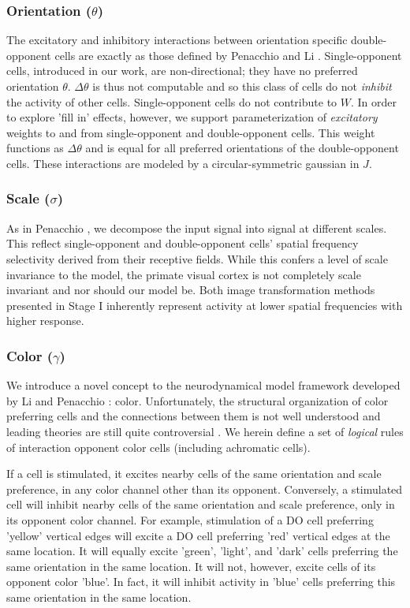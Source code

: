\documentclass[journal,onecolumn]{IEEEtran}
\begin{document}
\subsubsection*{Orientation ($\theta$)}
The excitatory and inhibitory interactions between orientation specific double-opponent cells are exactly as those defined by Penacchio \cite{penacchio:2013} and Li \cite{li:1999}. Single-opponent cells, introduced in our work, are non-directional; they have no preferred orientation $\theta$. $\Delta\theta$ is thus not computable and so this class of cells do not \textit{inhibit} the activity of other cells. Single-opponent cells do not contribute to $W$. In order to explore 'fill in' effects, however, we support parameterization of \textit{excitatory} weights to and from single-opponent and double-opponent cells. This weight functions as $\Delta\theta$ and is equal for all preferred orientations of the double-opponent cells. These interactions are modeled by a circular-symmetric gaussian in $J$. 

\subsubsection*{Scale ($\sigma$)}
As in Penacchio \cite{penacchio:2013}, we decompose the input signal into signal at different scales. This reflect single-opponent and double-opponent cells' spatial frequency selectivity derived from their receptive fields. While this confers a level of scale invariance to the model, the primate visual cortex is not completely scale invariant and nor should our model be. Both image transformation methods presented in Stage I inherently represent activity at lower spatial frequencies with higher response.

\subsubsection*{Color ($\gamma$)}
We introduce a novel concept to the neurodynamical model framework developed by Li \cite{li:1999} and Penacchio \cite{penacchio:2013}: color. Unfortunately, the structural organization of color preferring cells and the connections between them is not well understood and leading theories are still quite controversial \cite{shapley:2011}. We herein define a set of \textit{logical} rules of interaction opponent color cells (including achromatic cells).

If a cell is stimulated, it excites nearby cells of the same orientation and scale preference, in any color channel other than its opponent. Conversely, a stimulated cell will inhibit nearby cells of the same orientation and scale preference, only in its opponent color channel. For example, stimulation of a DO cell preferring 'yellow' vertical edges will excite a DO cell preferring 'red' vertical edges at the same location. It will equally excite 'green', 'light', and 'dark' cells preferring the same orientation in the same location. It will not, however, excite cells of its opponent color 'blue'. In fact, it will inhibit activity in 'blue' cells preferring this same orientation in the same location.
\end{document}
